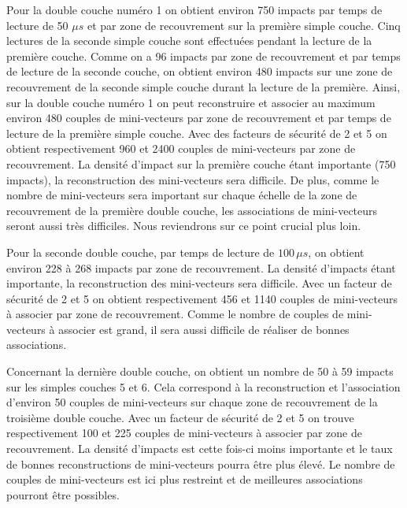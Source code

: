  Pour la double couche num\'ero 1 on obtient environ 750 impacts par temps de lecture de 50 $\mu s$ et par zone de recouvrement sur la premi\`ere simple couche. Cinq lectures de la seconde simple couche sont effectu\'ees pendant la lecture de la premi\`ere couche. Comme on a 96 impacts par zone de recouvrement et par temps de lecture de la seconde couche, on obtient environ 480 impacts sur une zone de recouvrement de la seconde simple couche durant la lecture de la premi\`ere. Ainsi, sur la double couche num\'ero 1 on peut reconstruire et associer au maximum environ 480 couples de mini-vecteurs par zone de recouvrement et par temps de lecture de la premi\`ere simple couche. Avec des facteurs de s\'ecurit\'e de 2 et 5 on obtient respectivement 960 et 2400 couples de mini-vecteurs par zone de recouvrement. La densit\'e d'impact sur la premi\`ere couche étant importante (750 impacts), la reconstruction des mini-vecteurs sera difficile. De plus, comme le nombre de mini-vecteurs sera important sur chaque échelle de la zone de recouvrement de la premi\`ere double couche, les associations de mini-vecteurs seront aussi tr\`es difficiles. Nous reviendrons sur ce point crucial plus loin.
  
  \medskip
  
  Pour la seconde double couche, par temps de lecture de $100 \, \mu s$, on obtient environ 228 \`a 268 impacts par zone de recouvrement. La densit\'e d'impacts \'etant importante, la reconstruction des mini-vecteurs sera difficile. Avec un facteur de s\'ecurit\'e de 2 et 5 on obtient respectivement 456 et 1140 couples de mini-vecteurs \`a associer par zone de recouvrement. Comme le nombre de couples de mini-vecteurs \`a associer est grand, il sera aussi difficile de r\'ealiser de bonnes associations.
  
  \medskip
  
  Concernant la dernière double couche, on obtient un nombre de 50 \`a 59 impacts sur les simples couches 5 et 6. Cela correspond \`a la reconstruction et l'association d'environ 50 couples de mini-vecteurs sur chaque zone de recouvrement de la troisi\`eme double couche. Avec un facteur de s\'ecurit\'e de 2 et 5 on trouve respectivement 100 et 225 couples de mini-vecteurs \`a associer par zone de recouvrement. La densit\'e d'impacts est cette fois-ci moins importante et le taux de bonnes reconstructions de mini-vecteurs pourra \^etre plus \'elev\'e. Le nombre de couples de mini-vecteurs est ici plus restreint et de meilleures associations pourront \^etre possibles.

